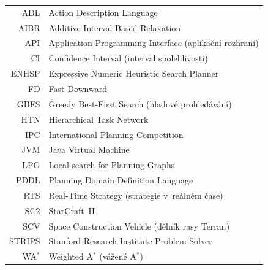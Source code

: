 \documentclass[czech,bachelor,oneside]{ctufit-thesis}
\begin{document}
\begin{tabular}{rl}
	ADL    & Action Description Language                             \\
	AIBR   & Additive Interval Based Relaxation                      \\
	API    & Application Programming Interface (aplikační rozhraní) \\
	CI     & Confidence Interval (interval spolehlivosti)            \\
	ENHSP  & Expressive Numeric Heuristic Search Planner             \\
	FD     & Fast Downward                                           \\
	GBFS   & Greedy Best-First Search (hladové prohledávání)         \\
	HTN    & Hierarchical Task Network                               \\
	IPC    & International Planning Competition                      \\
	JVM    & Java Virtual Machine                                    \\
	LPG    & Local search for Planning Graphs                        \\
	PDDL   & Planning Domain Definition Language                     \\
	RTS    & Real-Time Strategy (strategie v~reálném čase)           \\
	SC2    & StarCraft~II                                            \\
	SCV    & Space Construction Vehicle (dělník rasy Terran)         \\
	STRIPS & Stanford Research Institute Problem Solver              \\
	WA$^*$ & Weighted A$^*$ (vážené A$^*$)                           \\
\end{tabular}
\resumeTOCentries
\mainmatter\mainmatterinit %

\end{document}
